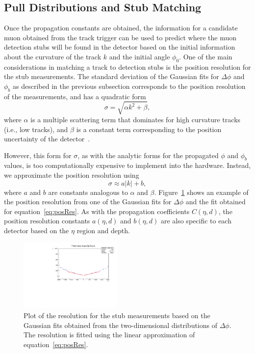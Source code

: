 \subsection{Pull Distributions and Stub Matching}
\label{subsec:pulls}

Once the propagation constants are obtained, the information for a candidate muon obtained from the track trigger can be used to predict where the muon detection stubs will be found in the detector based on the initial information about the curvature of the track $k$ and the initial angle $\phi_0$.
One of the main considerations in matching a track to detection stubs is the position resolution for the stub measurements.
The standard deviation of the Gaussian fits for $\Delta\phi$ and $\phi_b$ as described in the previous subsection corresponds to the position resolution of the measurements, and has a quadratic form
\begin{equation}
  \sigma=\sqrt{\alpha k^2+\beta},
\end{equation}
where $\alpha$ is a multiple scattering term that dominates for high curvature tracks (i.e., low \pt tracks), and $\beta$ is a constant term corresponding to the position uncertainty of the detector~\cite{PhysRevD.98.030001}.

However, this form for $\sigma$, as with the analytic forms for the propagated $\phi$ and $\phi_b$ values, is too computationally expensive to implement into the hardware.
Instead, we approximate the position resolution using
\begin{equation}\label{eq:posRes}
  \sigma\approx a|k|+b,
\end{equation}
where $a$ and $b$ are constants analogous to $\alpha$ and $\beta$.
Figure~\ref{fig:deltaPhiRes} shows an example of the position resolution from one of the Gaussian fits for $\Delta\phi$ and the fit obtained for equation~\ref{eq:posRes}.
As with the propagation coefficients $C(\eta,d)$, the position resolution constants $a(\eta,d)$ and $b(\eta,d)$ are also specific to each detector based on the $\eta$ region and depth.

\begin{figure}[htbp]
  \centering
  \includegraphics[width=0.45\textwidth]{fig/TPS/deltaPhi_res.pdf}
  \caption{
    Plot of the resolution for the stub measurements based on the Gaussian fits obtained from the two-dimensional distributions of $\Delta\phi$.
    The resolution is fitted using the linear approximation of equation~\ref{eq:posRes}.
  }
  \label{fig:deltaPhiRes}
\end{figure}

